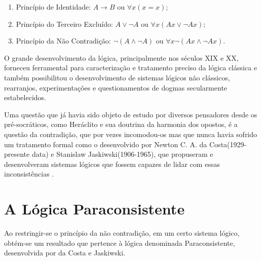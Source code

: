 \begin{enumerate}
\item Princípio de Identidade: 
    \begin{math}
	A \rightarrow B 
	\textrm{ ou } 
	\forall x(x=x);
    \end{math}

\item Princípio do Terceiro Excluído:
    \begin{math}
	A \vee \neg A
	\textrm{ ou }
	\forall x(Ax \vee \neg Ax);
    \end{math}

\item Princípio da Não Contradição: 
    \begin{math}
	\neg (A \wedge \neg A)
	\textrm{ ou }
	\forall x\neg(Ax \wedge \neg Ax).
    \end{math}

\end{enumerate}

O grande desenvolvimento da lógica, 
principalmente nos séculos XIX e XX, 
forneceu ferramental para caracterização e 
tratamento preciso da lógica clássica 
e também possibilitou o desenvolvimento de sistemas lógicos não clássicos, 
rearranjos, experimentações e 
questionamentos de dogmas secularmente estabelecidos.

Uma questão que já havia sido objeto de estudo por diversos pensadores desde os pré-socráticos, 
como Heráclito e sua doutrina da harmonia dos opostos, 
é a questão da contradição, 
que por vezes incomodou-os 
mas que nunca havia sofrido um tratamento formal 
como o desenvolvido por 
Newton C. A. da Costa(1929-presente data) e 
Stanislaw Jaskiwski(1906-1965), 
que propuseram e desenvolveram sistemas lógicos que fossem capazes de lidar com essas inconsistências \cite{DecioKrause}. 





\section{A Lógica Paraconsistente}





Ao restringir-se o princípio da não contradição, 
em um certo sistema lógico, 
obtém-se um resultado que pertence à lógica denominada Paraconsistente, 
desenvolvida por da Costa e Jaskiwski. 

